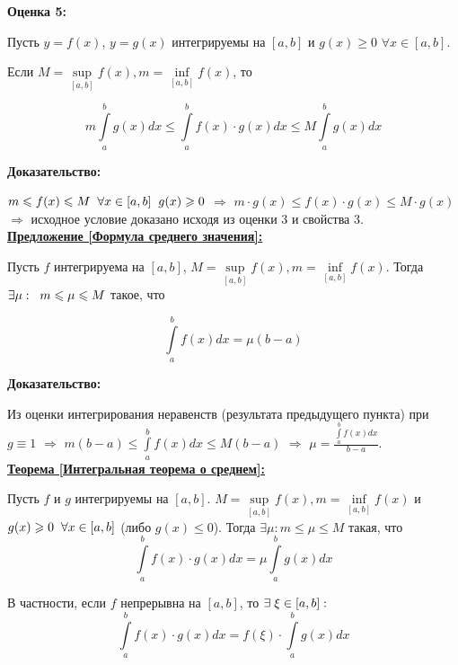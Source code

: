 \documentclass[a4paper,12pt]{article} %
\renewcommand {\geq}{\geqslant}
\renewcommand {\leq}{\leqslant}
\begin{document}
    \textbf{Оценка 5:}
    
    Пусть $ y = f(x) $, $ y = g(x) $ интегрируемы на $ [a, b] $ и $ g(x) \geq 0 $ $\forall x \in [a, b] $.
    
    Если $ M = \sup\limits_{[a, b]} f (x), m = \inf\limits_{[a, b]} f(x) $, то
    
    $$ m\int\limits_a^b g(x)dx \leq \int\limits_a^b f(x) \cdot g(x)dx \leq M \int\limits_a^b g(x)dx $$
    
    \textbf{Доказательство:}
    
    $ m \leq f (x) \leq M \hspace{2 mm} \forall x \in [a, b]  \hspace{2 mm} g (x) \geq 0 $ $ \Rightarrow $
    $ m \cdot g(x) \leq f(x) \cdot g(x) \leq M \cdot g (x) $ \\ [2 mm] $ \Rightarrow $ исходное условие доказано исходя из оценки 3 и свойства 3.\\
    
\underline{\textbf{Предложение [Формула среднего значения]: }}

Пусть $ f $ интегрируема на $ [a, b] $, $ M = \sup\limits_{[a, b]} f(x), m = \inf\limits_{[a, b]} f(x) $. Тогда $ \exists \mu: \hspace{2 mm} m \leq \mu \leq M $ такое, что

$$ \int\limits_a^b f(x)dx = \mu (b - a)$$

\textbf{Доказательство:}

Из оценки интегрирования неравенств (результата предыдущего пункта) при $ g \equiv 1 $ $\Rightarrow$ $ m (b - a) \leq \int\limits_a^b f (x)dx \leq M(b - a) $ $ \Rightarrow $ $\displaystyle \mu = \frac {\int\limits_a^b f(x)dx}{b -a }$.\\

\underline{\textbf{Теорема [Интегральная теорема о среднем]:}}

Пусть $ f $ и $ g $ интегрируемы на $ [a, b] $. $ M = \sup\limits_{[a,b]} f(x), m = \inf\limits_{[a,b]} f(x) $ и $ g(x) \geq 0 \hspace{2mm} \forall x \in [a, b] $ (либо  $g (x) \leq 0 $). Тогда $\exists \mu: m \leq \mu \leq M $ такая, что
$$ \int\limits_a^b f(x) \cdot g(x)dx = \mu \int\limits_a^b g(x)dx$$

В частности, если $ f $ непрерывна на $ [a, b] $, то $\exists \hspace{1 mm} \xi \in [a,b]: $ \\ 
$$ \int\limits_a^b f(x) \cdot g(x)dx = f(\xi) \cdot \int\limits_a^b g(x)dx$$
\end{document}
